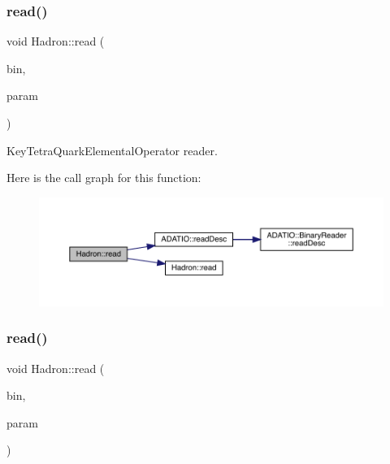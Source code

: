 \subsubsection{\texorpdfstring{read()}{read()}\hspace{0.1cm}{\footnotesize\ttfamily [41/94]}}
{\footnotesize\ttfamily void Hadron\+::read (\begin{DoxyParamCaption}\item[{\mbox{\hyperlink{classADATIO_1_1BinaryReader}{Binary\+Reader}} \&}]{bin,  }\item[{\mbox{\hyperlink{structHadron_1_1KeyTetraQuarkElementalOperator__t}{Key\+Tetra\+Quark\+Elemental\+Operator\+\_\+t}} \&}]{param }\end{DoxyParamCaption})}



Key\+Tetra\+Quark\+Elemental\+Operator reader. 

Here is the call graph for this function\+:\nopagebreak
\begin{figure}[H]
\begin{center}
\leavevmode
\includegraphics[width=350pt]{d1/daf/namespaceHadron_a10d99bb52996f8aec8a87612e98d5684_cgraph}
\end{center}
\end{figure}
\mbox{\label{namespaceHadron_ae6acb258c409e20fdd2a36b3266138bc}} 
\subsubsection{\texorpdfstring{read()}{read()}\hspace{0.1cm}{\footnotesize\ttfamily [42/94]}}
{\footnotesize\ttfamily void Hadron\+::read (\begin{DoxyParamCaption}\item[{\mbox{\hyperlink{classADATIO_1_1BinaryReader}{Binary\+Reader}} \&}]{bin,  }\item[{\mbox{\hyperlink{structHadron_1_1KeyMesonElementalOperator__t}{Key\+Meson\+Elemental\+Operator\+\_\+t}} \&}]{param }\end{DoxyParamCaption})}



